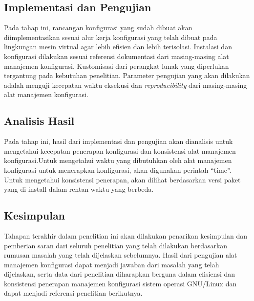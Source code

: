 \documentclass[10pt,]{report}
\begin{document}
\begin{adjustwidth}{20pt}{}
	\subsection{Implementasi dan Pengujian}
	\vspace{-3mm}
	\begin{adjustwidth}{20pt}{}
		Pada tahap ini, rancangan konfigurasi yang sudah dibuat akan
		diimplementasikan sesuai alur kerja konfigurasi yang telah dibuat pada
		lingkungan mesin virtual agar lebih efisien dan lebih terisolasi. Instalasi
		dan konfigurasi dilakukan sesuai referensi dokumentasi dari masing-masing
		alat manajemen konfigurasi. Kustomisasi dari perangkat lunak yang
		diperlukan tergantung pada kebutuhan penelitian. Parameter pengujian yang
		akan dilakukan adalah menguji kecepatan waktu eksekusi dan \textit{reproducibility} dari
		masing-masing alat manajemen konfigurasi.
	\end{adjustwidth}
\end{adjustwidth}
\begin{adjustwidth}{20pt}{}
	\subsection{Analisis Hasil}
	\vspace{-3mm}
	\begin{adjustwidth}{20pt}{}
		Pada tahap ini, hasil dari implementasi dan pengujian akan dianalisis untuk
		mengetahui kecepatan penerapan konfigurasi dan konsistensi alat manajemen
		konfigurasi.Untuk mengetahui waktu yang dibutuhkan oleh alat manajemen
		konfigurasi untuk menerapkan konfigurasi, akan digunakan perintah “time”.
		Untuk mengetahui konsistensi penerapan, akan dilihat berdasarkan versi
		paket yang di install dalam rentan waktu yang berbeda.
	\end{adjustwidth}
\end{adjustwidth}

\begin{adjustwidth}{20pt}{}
	\subsection{Kesimpulan}
	\vspace{-3mm}
	\begin{adjustwidth}{20pt}{}
		Tahapan terakhir dalam penelitian ini akan dilakukan penarikan kesimpulan
		dan pemberian saran dari seluruh penelitian yang telah dilakukan
		berdasarkan rumusan masalah yang telah dijelaskan sebelumnya. Hasil dari
		pengujian alat manajemen konfigurasi dapat menjadi jawaban dari masalah
		yang telah dijelaskan, serta data dari penelitian diharapkan berguna dalam
		efisiensi dan konsistensi penerapan manajemen konfigurasi sistem operasi
		GNU/Linux dan dapat menjadi referensi penelitian berikutnya.
	\end{adjustwidth}
\end{adjustwidth}
\vspace{3mm}
\end{document}
